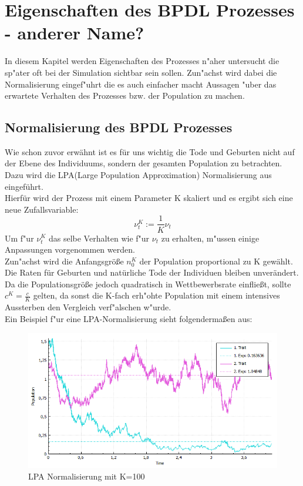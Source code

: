 \documentclass[11pt, a4paper, german]{article}
\begin{document}
\clearpage
\section{Eigenschaften des BPDL Prozesses\\ - anderer Name?}
In diesem Kapitel werden Eigenschaften des Prozesses n"aher untersucht die sp"ater oft bei der Simulation sichtbar sein sollen. Zun"achst wird dabei die Normalisierung eingef"uhrt die es auch einfacher macht Aussagen "uber das erwartete Verhalten des Prozesses bzw. der Population zu machen. 

\subsection{Normalisierung des BPDL Prozesses}
	Wie schon zuvor erwähnt ist es für uns wichtig die Tode und Geburten nicht auf der Ebene des Individuums, sondern der gesamten Population zu betrachten. Dazu wird die LPA(Large Population Approximation) Normalisierung aus \cite{fournier2004microscopic} eingeführt.\\
	Hierfür wird der Prozess mit einem Parameter K skaliert und es ergibt sich eine neue Zufallsvariable:
	\[ \nu_t^K := \frac{1}{K} \nu_t \]
	Um f"ur $ \nu_t^K $ das selbe Verhalten wie f"ur $ \nu_t $ zu erhalten, m"ussen einige Anpassungen vorgenommen werden.\\
	Zun"achst wird die Anfangsgröße $ n_0^K $ der Population proportional zu K gewählt.
	Die Raten für Geburten und natürliche Tode der Individuen bleiben unverändert. Da die Populationsgröße jedoch quadratisch in Wettbewerbsrate einfließt, sollte $ c^K = \frac{c}{K} $ gelten, da sonst die K-fach erh"ohte Population mit einem intensives Aussterben den Vergleich verf"alschen w"urde. \\
	Ein Beispiel f"ur eine LPA-Normalisierung sieht folgendermaßen aus:
	\begin{figure}[H]
		\centering
		\includegraphics[width=0.7\linewidth]{./Pictures/LPANormalisierungK100}
		\caption[LPAK100]{LPA Normalisierung mit K=100}
		\label{LPA Normalisierung K=100}
	\end{figure}
\end{document}
